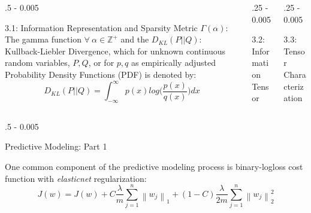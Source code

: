 \documentclass{postertheme}\usepackage[]{graphicx}\usepackage[]{color}
\begin{document}
\begin{frame}
\begin{columns}[onlytextwidth]
\begin{column}{.5 \textwidth - 0.005 \textwidth}
\begin{block}{3.1: Information Representation and Sparsity Metric}
    $\Gamma(\alpha)$: The gamma function $\forall \ \alpha \in \mathbb{Z}^+$ and the
    $D_{KL}(P \vert\vert Q)$: Kullback-Liebler Divergence, which for unknown continuous random variables,
    $P, Q$, or for $p, q$ as empirically adjusted Probability Density Functions (PDF) is denoted by:
    \begin{equation}
        D_{KL}(P \vert\vert Q) = \int_{-\infty}^{\infty} p(x) log \Big( \frac{p(x)}{q(x)} \Big) dx 
    \end{equation}

    \end{block}
  \end{column}
  
  \begin{column}{.25 \textwidth - 0.005 \textwidth}
    \begin{block}{3.2: Information Tensor \footnotesize } \footnotesize
        
      
    \end{block}
  \end{column}

  \begin{column}{.25 \textwidth - 0.005 \textwidth}
    \begin{block}{3.3: Tensor Characterization } \footnotesize
        

    \end{block}
  \end{column}
  
  
\end{columns}


\begin{columns}[onlytextwidth]
  
  \begin{column}{.5 \textwidth - 0.005 \textwidth}
    \begin{block}{Predictive Modeling: Part 1} \footnotesize
        
      One common component of the predictive modeling process is binary-logloss cost function 
      with \textit{elasticnet} regularization:
      \begin{equation*}
          J(w) =  J(w) + C \frac{\lambda}{m} \sum_{j=1}^n \left \lVert w_j \right\rVert_1 + (1 - C)
          \frac{\lambda}{2m} \sum_{j=1}^n \left \lVert w_j \right\rVert_2^2
      \end{equation*}
      

\end{block}
\end{column}
\end{columns}
\end{frame}
\end{document}
